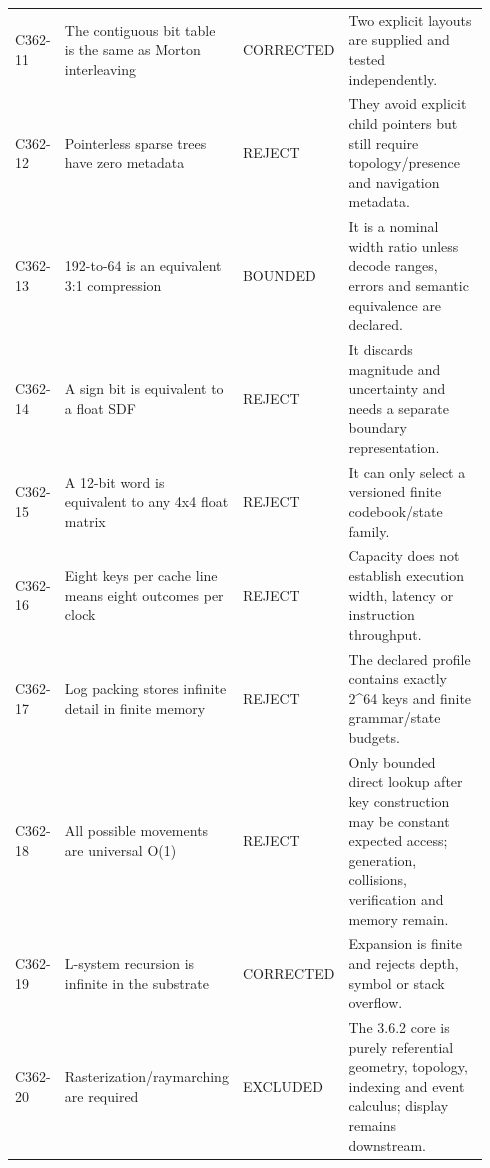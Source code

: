 \begin{longtable}{p{0.08\linewidth} p{0.28\linewidth} p{0.11\linewidth} p{0.47\linewidth}}
C362-11 & The contiguous bit table is the same as Morton interleaving & CORRECTED & Two explicit layouts are supplied and tested independently.\\
C362-12 & Pointerless sparse trees have zero metadata & REJECT & They avoid explicit child pointers but still require topology/presence and navigation metadata.\\
C362-13 & 192-to-64 is an equivalent 3:1 compression & BOUNDED & It is a nominal width ratio unless decode ranges, errors and semantic equivalence are declared.\\
C362-14 & A sign bit is equivalent to a float SDF & REJECT & It discards magnitude and uncertainty and needs a separate boundary representation.\\
C362-15 & A 12-bit word is equivalent to any 4x4 float matrix & REJECT & It can only select a versioned finite codebook/state family.\\
C362-16 & Eight keys per cache line means eight outcomes per clock & REJECT & Capacity does not establish execution width, latency or instruction throughput.\\
C362-17 & Log packing stores infinite detail in finite memory & REJECT & The declared profile contains exactly 2\textasciicircum{}64 keys and finite grammar/state budgets.\\
C362-18 & All possible movements are universal O(1) & REJECT & Only bounded direct lookup after key construction may be constant expected access; generation, collisions, verification and memory remain.\\
C362-19 & L-system recursion is infinite in the substrate & CORRECTED & Expansion is finite and rejects depth, symbol or stack overflow.\\
C362-20 & Rasterization/raymarching are required & EXCLUDED & The 3.6.2 core is purely referential geometry, topology, indexing and event calculus; display remains downstream.\\
\bottomrule
\end{longtable}
